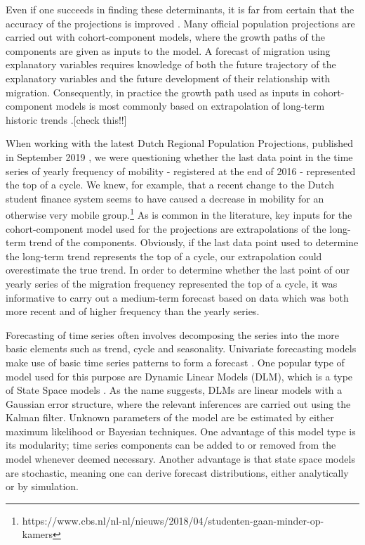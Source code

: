 \documentclass[12pt, a4paper]{article}
\begin{document}
Even if one succeeds in finding these determinants, it is far from certain that 
the accuracy of the projections is improved \citep{smith1997further}. Many
official population projections are carried out with cohort-component
models, where the growth paths of the components are given as inputs to
the model. A forecast of migration using explanatory variables requires
knowledge of both the future trajectory of the explanatory variables and
the future development of their relationship with migration.
Consequently, in practice the growth path used as inputs in
cohort-component models is most commonly based on extrapolation of
long-term historic trends \citep{smith2013practitioner}.[check this!!]

When working with the latest Dutch Regional Population Projections,
published in September 2019 \citep{teriele2019}, we were questioning
whether the last data point in the time series of yearly frequency of
mobility - registered at the end of 2016 - represented the top of a
cycle. We knew, for example, that a recent change to the Dutch student
finance system seems to have caused a decrease in mobility for an
otherwise very mobile
group.\footnote{https://www.cbs.nl/nl-nl/nieuws/2018/04/studenten-gaan-minder-op-kamers}
As is common in the literature, key inputs for the cohort-component
model used for the projections are extrapolations of the long-term trend
of the components. Obviously, if the last data point used to determine
the long-term trend represents the top of a cycle, our extrapolation
could overestimate the true trend. In order to determine whether the
last point of our yearly series of the migration frequency represented
the top of a cycle, it was informative to carry out a medium-term
forecast based on data which was both more recent and of higher
frequency than the yearly series.

Forecasting of time series often involves decomposing the series into
the more basic elements such as trend, cycle and seasonality. Univariate
forecasting models make use of basic time series patterns to form a
forecast \citep{zietz2014us}. One popular type of model used for this
purpose are Dynamic Linear Models (DLM), which is a type of State Space
models \citep{petris2009dynamic, durbin2012time}. As the name suggests,
DLMs are linear models with a Gaussian error structure, where the
relevant inferences are carried out using the Kalman filter. Unknown
parameters of the model are be estimated by either maximum likelihood or
Bayesian techniques. One advantage of this model type is its modularity;
time series components can be added to or removed from the model
whenever deemed necessary. Another advantage is that state space models
are stochastic, meaning one can derive forecast distributions, either
analytically or by simulation.
\end{document}
